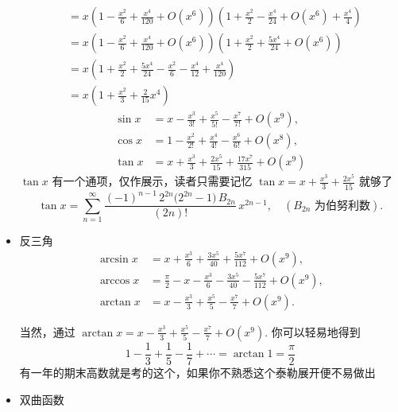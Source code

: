 \documentclass[lang=cn,newtx,10pt,scheme=chinese]{elegantbook}
\begin{document}
\begin{itemize}
\begin{equation}
\begin{aligned}
    &=x(1-\frac{x^{2}}{6}+\frac{x^{4}}{120}+O(x^{6}))(1+\frac{x^{2}}{2}-\frac{x^{4}}{24}+O(x^{6})+\frac{x^{4}}{4}) \\
    &=x(1-\frac{x^{2}}{6}+\frac{x^{4}}{120}+O(x^{6}))(1+\frac{x^{2}}{2}+\frac{5x^{4}}{24}+O(x^{6})) \\
    &=x(1+\frac{x^{2}}{2}+\frac{5x^{4}}{24}-\frac{x^{2}}{6}-\frac{x^{4}}{12}+\frac{x^{4}}{120}) \\
    &=x(1+\frac{x^{2}}{3}+\frac{2}{15}x^{4})
    \end{aligned}
  \end{equation}
  \begin{equation}
    \begin{aligned}
      \sin x &= x-\frac{x^{3}}{3!}+\frac{x^{5}}{5!}-\frac{x^{7}}{7!}+O(x^{9}),\\
      \cos x &= 1-\frac{x^{2}}{2!}+\frac{x^{4}}{4!}-\frac{x^{6}}{6!}+O(x^{8}),\\
      \tan x &= x+\frac{x^{3}}{3}+\frac{2x^{5}}{15}+\frac{17x^{7}}{315}+O(x^{9})
    \end{aligned}
  \end{equation}
  $\tan x$ 有一个通项，仅作展示，读者只需要记忆 $\tan x = x+\frac{x^{3}}{3}+\frac{2x^{5}}{15}$ 就够了
  \begin{equation}
    \tan x = \sum_{n=1}^{\infty} \frac{(-1)^{n-1}\,2^{2n}\big(2^{2n}-1\big)\,B_{2n}}{(2n)!}\,x^{2n-1},\quad (B_{2n}\text{ 为伯努利数}).
  \end{equation}

    
  \item 反三角
  \begin{equation}
    \begin{aligned}
      \arcsin x &= x+\frac{x^{3}}{6}+\frac{3x^{5}}{40}+\frac{5x^{7}}{112}+O(x^{9}),\\
      \arccos x &= \frac{\pi}{2}-x-\frac{x^{3}}{6}-\frac{3x^{5}}{40}-\frac{5x^{7}}{112}+O(x^{9}),\\
      \arctan x &= x-\frac{x^{3}}{3}+\frac{x^{5}}{5}-\frac{x^{7}}{7}+O(x^{9}).
    \end{aligned}
  \end{equation}
  \begin{note}
    当然，通过 $\arctan x = x-\frac{x^{3}}{3}+\frac{x^{5}}{5}-\frac{x^{7}}{7}+O(x^{9}).$ 你可以轻易地得到 \begin{equation}
      1-\frac{1}{3}+\frac{1}{5}-\frac{1}{7}+ \cdots =\arctan 1=\frac{\pi}{2}
    \end{equation}
    有一年的期末高数就是考的这个，如果你不熟悉这个泰勒展开便不易做出
  \end{note}
  \item 双曲函数
  

\end{itemize}
\end{document}
